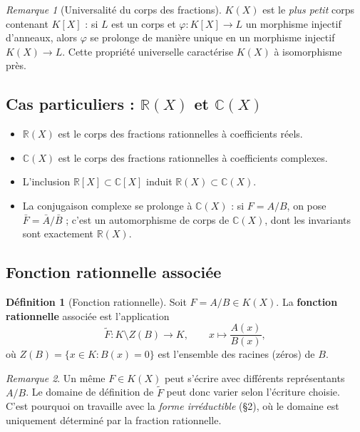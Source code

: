 \documentclass[12pt,a4paper]{report}
\theoremstyle{definition}
\newtheorem{definition}{Définition}[section]
\theoremstyle{remark}
\newtheorem{remarque}{Remarque}[section]
\begin{document}
\begin{remarque}[Universalité du corps des fractions]
$K(X)$ est le \emph{plus petit} corps contenant $K[X]$ : si $L$ est un corps et $\varphi : K[X] \to L$ un morphisme injectif d'anneaux, alors $\varphi$ se prolonge de manière unique en un morphisme injectif $K(X) \to L$. Cette propriété universelle caractérise $K(X)$ à isomorphisme près.
\end{remarque}

\subsection{Cas particuliers : $\mathbb{R}(X)$ et $\mathbb{C}(X)$}

\begin{itemize}
    \item $\mathbb{R}(X)$ est le corps des fractions rationnelles à coefficients réels.
    \item $\mathbb{C}(X)$ est le corps des fractions rationnelles à coefficients complexes.
    \item L'inclusion $\mathbb{R}[X] \subset \mathbb{C}[X]$ induit $\mathbb{R}(X) \subset \mathbb{C}(X)$.
    \item La conjugaison complexe se prolonge à $\mathbb{C}(X)$ : si $F = A/B$, on pose $\bar{F} = \bar{A}/\bar{B}$ ; c'est un automorphisme de corps de $\mathbb{C}(X)$, dont les invariants sont exactement $\mathbb{R}(X)$.
\end{itemize}

\subsection{Fonction rationnelle associée}

\begin{definition}[Fonction rationnelle]
Soit $F = A/B \in K(X)$. La \textbf{fonction rationnelle} associée est l'application
\[ \widetilde{F} : K \setminus Z(B) \longrightarrow K, \qquad x \longmapsto \frac{A(x)}{B(x)}, \]
où $Z(B) = \{x \in K : B(x) = 0\}$ est l'ensemble des racines (zéros) de $B$.
\end{definition}

\begin{remarque}
Un même $F \in K(X)$ peut s'écrire avec différents représentants $A/B$. Le domaine de définition de $\widetilde{F}$ peut donc varier selon l'écriture choisie. C'est pourquoi on travaille avec la \emph{forme irréductible} (§2), où le domaine est uniquement déterminé par la fraction rationnelle.
\end{remarque}
\end{document}
